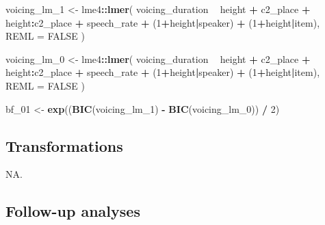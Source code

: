 \documentclass[11pt,]{article}
\newenvironment{Shaded}{\begin{snugshade}}{\end{snugshade}}
\newcommand{\DataTypeTok}[1]{\textcolor[rgb]{0.13,0.29,0.53}{#1}}
\newcommand{\DecValTok}[1]{\textcolor[rgb]{0.00,0.00,0.81}{#1}}
\newcommand{\KeywordTok}[1]{\textcolor[rgb]{0.13,0.29,0.53}{\textbf{#1}}}
\newcommand{\NormalTok}[1]{#1}
\newcommand{\OperatorTok}[1]{\textcolor[rgb]{0.81,0.36,0.00}{\textbf{#1}}}
\newcommand{\OtherTok}[1]{\textcolor[rgb]{0.56,0.35,0.01}{#1}}
\newcommand{\StringTok}[1]{\textcolor[rgb]{0.31,0.60,0.02}{#1}}
\begin{document}
\begin{Shaded}
\begin{Highlighting}[]
\NormalTok{voicing_lm_}\DecValTok{1}\NormalTok{ <-}\StringTok{ }\NormalTok{lme4}\OperatorTok{::}\KeywordTok{lmer}\NormalTok{(}
\NormalTok{  voicing_duration }\OperatorTok{~}
\StringTok{    }\NormalTok{height }\OperatorTok{+}
\StringTok{    }\NormalTok{c2_place }\OperatorTok{+}
\StringTok{    }\NormalTok{height}\OperatorTok{:}\NormalTok{c2_place }\OperatorTok{+}
\StringTok{    }\NormalTok{speech_rate }\OperatorTok{+}
\StringTok{    }\NormalTok{(}\DecValTok{1}\OperatorTok{+}\NormalTok{height}\OperatorTok{|}\NormalTok{speaker) }\OperatorTok{+}
\StringTok{    }\NormalTok{(}\DecValTok{1}\OperatorTok{+}\NormalTok{height}\OperatorTok{|}\NormalTok{item),}
  \DataTypeTok{REML =} \OtherTok{FALSE}
\NormalTok{)}

\NormalTok{voicing_lm_}\DecValTok{0}\NormalTok{ <-}\StringTok{ }\NormalTok{lme4}\OperatorTok{::}\KeywordTok{lmer}\NormalTok{(}
\NormalTok{  voicing_duration }\OperatorTok{~}
\StringTok{    }\NormalTok{height }\OperatorTok{+}
\StringTok{    }\NormalTok{c2_place }\OperatorTok{+}
\StringTok{    }\NormalTok{height}\OperatorTok{:}\NormalTok{c2_place }\OperatorTok{+}
\StringTok{    }\NormalTok{speech_rate }\OperatorTok{+}
\StringTok{    }\NormalTok{(}\DecValTok{1}\OperatorTok{+}\NormalTok{height}\OperatorTok{|}\NormalTok{speaker) }\OperatorTok{+}
\StringTok{    }\NormalTok{(}\DecValTok{1}\OperatorTok{+}\NormalTok{height}\OperatorTok{|}\NormalTok{item),}
  \DataTypeTok{REML =} \OtherTok{FALSE}
\NormalTok{)}

\NormalTok{bf_}\DecValTok{01}\NormalTok{ <-}\StringTok{ }\KeywordTok{exp}\NormalTok{((}\KeywordTok{BIC}\NormalTok{(voicing_lm_}\DecValTok{1}\NormalTok{) }\OperatorTok{-}\StringTok{ }\KeywordTok{BIC}\NormalTok{(voicing_lm_}\DecValTok{0}\NormalTok{)) }\OperatorTok{/}\StringTok{ }\DecValTok{2}\NormalTok{)}
\end{Highlighting}
\end{Shaded}

\hypertarget{transformations}{%
\subsection{Transformations}\label{transformations}}

NA.

\hypertarget{follow-up-analyses}{%
\subsection{Follow-up analyses}\label{follow-up-analyses}}
\end{document}
